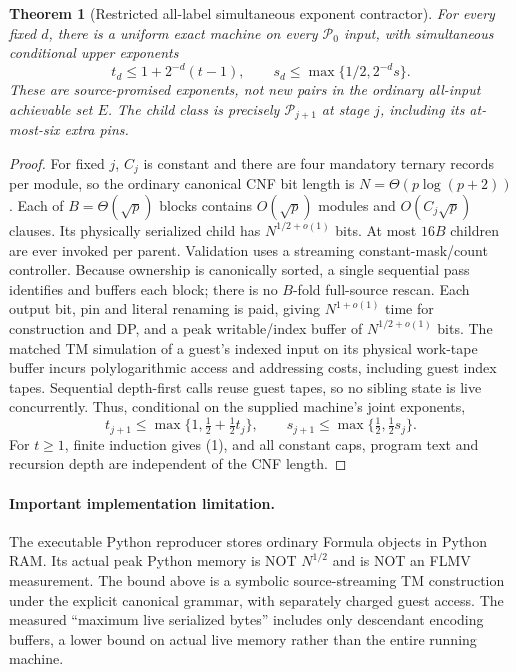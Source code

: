 \documentclass[11pt]{article}
\newtheorem{theorem}{Theorem}
\newcommand{\PATH}{\mathcal P}
\begin{document}
\begin{theorem}[Restricted all-label simultaneous exponent contractor]
For every fixed $d$, there is a uniform exact machine on every
$\PATH_0$ input, with simultaneous conditional upper exponents
\[
\boxed{\quad t_d\le1+2^{-d}(t-1),\qquad
s_d\le\max\{1/2,2^{-d}s\}.\quad}
\tag{1}
\]
These are source-promised exponents, not new pairs in the ordinary
all-input achievable set $E$. The child class is precisely
$\PATH_{j+1}$ at stage $j$, including its at-most-six extra pins.
\end{theorem}
\begin{proof}
For fixed $j$, $C_j$ is constant and there are four mandatory
ternary records per module, so the ordinary canonical CNF bit length
is $N=\Theta(p\log(p+2))$. Each of $B=\Theta(\sqrt p)$ blocks
contains $O(\sqrt p)$ modules and $O(C_j\sqrt p)$ clauses. Its
physically serialized child has $N^{1/2+o(1)}$ bits. At most $16B$
children are ever invoked per parent. Validation uses a streaming
constant-mask/count controller. Because ownership is canonically
sorted, a single sequential pass identifies and buffers each block;
there is no $B$-fold full-source rescan. Each output bit, pin and
literal renaming is paid, giving $N^{1+o(1)}$ time for construction
and DP, and a peak writable/index buffer of $N^{1/2+o(1)}$ bits.
The matched TM simulation of a guest's indexed input on its
physical work-tape buffer incurs polylogarithmic access and
addressing costs, including guest index tapes. Sequential depth-first
calls reuse guest tapes, so no sibling state is live concurrently.
Thus, conditional on the supplied machine's joint exponents,
\[
 t_{j+1}\le\max\{1,\tfrac12+\tfrac12t_j\},\qquad
 s_{j+1}\le\max\{\tfrac12,\tfrac12s_j\}.
\]
For $t\ge1$, finite induction gives (1), and all constant caps,
program text and recursion depth are independent of the CNF length.
\end{proof}
\paragraph{Important implementation limitation.}
The executable Python reproducer stores ordinary Formula objects in
Python RAM. Its actual peak Python memory is NOT $N^{1/2}$ and is NOT
an FLMV measurement. The bound above is a symbolic source-streaming
TM construction under the explicit canonical grammar, with separately
charged guest access. The measured ``maximum live serialized bytes''
includes only descendant encoding buffers, a lower bound on actual
live memory rather than the entire running machine.
\end{document}
